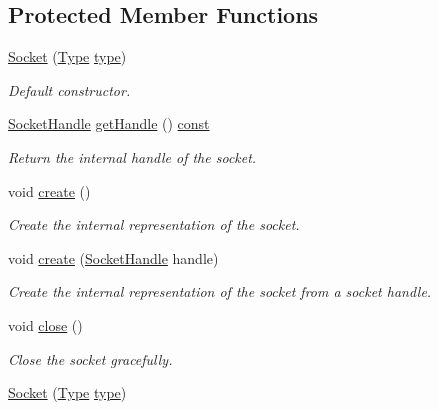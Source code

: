 \subsection*{Protected Member Functions}
\begin{DoxyCompactItemize}
\item 
\hyperlink{classsf_1_1_socket_a80ffb47ec0bafc83af019055d3e6a303}{Socket} (\hyperlink{classsf_1_1_socket_a5d3ff44e56e68f02816bb0fabc34adf8}{Type} \hyperlink{_entity_8cpp_aa209819775142a76b8e49319d79ecab2}{type})
\begin{DoxyCompactList}\small\item\em Default constructor. \end{DoxyCompactList}\item 
\hyperlink{namespacesf_aefabb521d8f5eec9e6a9b521271d20d1}{Socket\-Handle} \hyperlink{classsf_1_1_socket_ac0c63b13e61da8294bf54e888e97f9a3}{get\-Handle} () \hyperlink{term__entry_8h_a57bd63ce7f9a353488880e3de6692d5a}{const} 
\begin{DoxyCompactList}\small\item\em Return the internal handle of the socket. \end{DoxyCompactList}\item 
void \hyperlink{classsf_1_1_socket_aafbe140f4b1921e0d19e88cf7a61dcbc}{create} ()
\begin{DoxyCompactList}\small\item\em Create the internal representation of the socket. \end{DoxyCompactList}\item 
void \hyperlink{classsf_1_1_socket_af1dd898f7aa3ead7ff7b2d1c20e97781}{create} (\hyperlink{namespacesf_aefabb521d8f5eec9e6a9b521271d20d1}{Socket\-Handle} handle)
\begin{DoxyCompactList}\small\item\em Create the internal representation of the socket from a socket handle. \end{DoxyCompactList}\item 
void \hyperlink{classsf_1_1_socket_a71f2f5c2aa99e01cafe824fee4c573be}{close} ()
\begin{DoxyCompactList}\small\item\em Close the socket gracefully. \end{DoxyCompactList}\item 
\hyperlink{classsf_1_1_socket_a80ffb47ec0bafc83af019055d3e6a303}{Socket} (\hyperlink{classsf_1_1_socket_a5d3ff44e56e68f02816bb0fabc34adf8}{Type} \hyperlink{_entity_8cpp_aa209819775142a76b8e49319d79ecab2}{type})

\end{DoxyCompactItemize}

